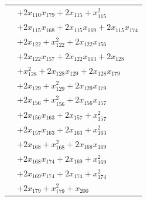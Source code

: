 \begin{longtable}{@{}r@{\;}l@{}}
 & \(\displaystyle +2x_{110}x_{179} +2x_{115} +x_{115}^{2}\) \\
 & \(\displaystyle +2x_{115}x_{168} +2x_{115}x_{169} +2x_{115}x_{174}\) \\
 & \(\displaystyle +2x_{122} +x_{122}^{2} +2x_{122}x_{156}\) \\
 & \(\displaystyle +2x_{122}x_{157} +2x_{122}x_{163} +2x_{128}\) \\
 & \(\displaystyle +x_{128}^{2} +2x_{128}x_{129} +2x_{128}x_{179}\) \\
 & \(\displaystyle +2x_{129} +x_{129}^{2} +2x_{129}x_{179}\) \\
 & \(\displaystyle +2x_{156} +x_{156}^{2} +2x_{156}x_{157}\) \\
 & \(\displaystyle +2x_{156}x_{163} +2x_{157} +x_{157}^{2}\) \\
 & \(\displaystyle +2x_{157}x_{163} +2x_{163} +x_{163}^{2}\) \\
 & \(\displaystyle +2x_{168} +x_{168}^{2} +2x_{168}x_{169}\) \\
 & \(\displaystyle +2x_{168}x_{174} +2x_{169} +x_{169}^{2}\) \\
 & \(\displaystyle +2x_{169}x_{174} +2x_{174} +x_{174}^{2}\) \\
 & \(\displaystyle +2x_{179} +x_{179}^{2} +x_{200}\) \\[3pt]
\end{longtable}
\endgroup
